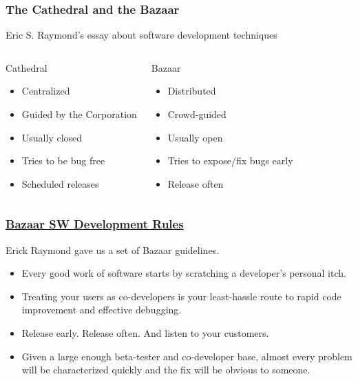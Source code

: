 \documentclass[hyperref={pdfpagelabels=false},xcolor=pst,pdf,fragile]{beamer}
\begin{document}
\begin{frame}
  \frametitle{The Cathedral and the Bazaar}

  Eric S. Raymond's essay about software development techniques

  \begin{columns}
	  \begin{block}{Cathedral}
		  \begin{itemize}
			  \item Centralized
			  \item Guided by the Corporation
			  \item Usually closed
			  \item Tries to be bug free
			  \item Scheduled releases
		  \end{itemize}
	  \end{block}

	  \begin{block}{Bazaar}
		  \begin{itemize}
			  \item Distributed
			  \item Crowd-guided
			  \item Usually open
			  \item Tries to expose/fix bugs early
			  \item Release often
		  \end{itemize}
	  \end{block}
  \end{columns}

\end{frame}

\begin{frame}
  \frametitle{
	  \href{https://en.wikipedia.org/wiki/The_Cathedral_and_the_Bazaar\#Guidelines_for_creating_good_open_source_software}
	  {Bazaar SW Development Rules}
  }

  Erick Raymond gave us a set of Bazaar guidelines.
  \begin{itemize}
	  \pause
	\item Every good work of software starts by scratching a developer's
	  personal itch.

	  \pause
	\item Treating your users as co-developers is your least-hassle route
	  to rapid code improvement and effective debugging.

	  \pause
	\item Release early. Release often. And listen to your customers.

	\pause
	\item Given a large enough beta-tester and co-developer base, almost
	  every problem will be characterized quickly and the fix will be obvious to
	  someone.

  \end{itemize}

\end{frame}
\end{document}
